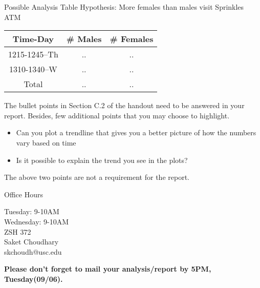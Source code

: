 \documentclass[10pt]{beamer}
\begin{document}
\begin{frame}[fragile]{Possible Analysis Table}
Hypothesis: More females than males visit Sprinkles ATM 
\begin{table}
\begin{tabular}{c|c|c}
Time-Day & \# Males & \# Females\\
\hline
1215-1245--Th & .. & ..\\
1310-1340--W  & .. & ..\\
\hline
Total & .. & ..
\end{tabular}
\end{table}
The bullet points in Section C.2 of the handout need to be answered in your report. Besides, few additional points that you may choose to highlight. 
\begin{itemize}
\item Can you plot a trendline that gives you a better picture of how the
numbers vary based on time
\item Is it possible to explain the trend you see in the plots?
\end{itemize}
The above two points are not a requirement for the report.
\end{frame}

\begin{frame}[fragile]{Office Hours}
\Large \begin{center}Tuesday: 9-10AM\\
Wednesday: 9-10AM\\
ZSH 372\\
\vspace*{2cm}
Saket Choudhary\\ 
skchoudh@usc.edu\\
\end{center}

\textbf{Please don't forget to mail your analysis/report by 5PM, Tuesday(09/06).}

\end{frame}
\end{document}
